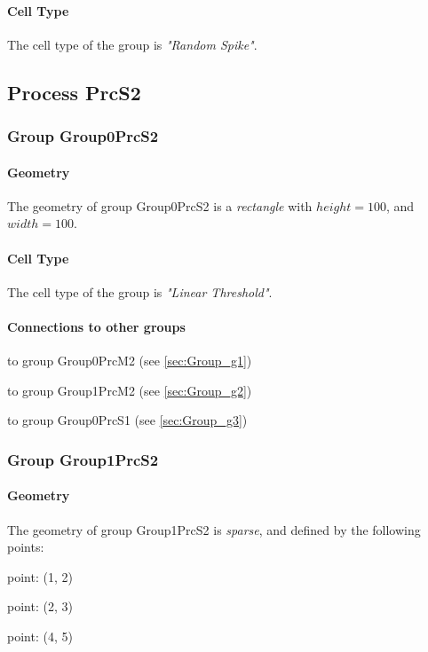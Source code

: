 \documentclass[a4paper, 11pt]{article}
\begin{document}
\paragraph*{Cell Type}
The cell type of the group is \emph{"Random Spike"}.

\subsection{Process PrcS2}


\subsubsection{Group Group0PrcS2}
\label{sec:Group_g5}

\paragraph*{Geometry}

The geometry of group Group0PrcS2 is a \emph{rectangle} with
$height= 100$, and $width= 100$.

\paragraph*{Cell Type}
The cell type of the group is \emph{"Linear Threshold"}.
\paragraph*{Connections to other groups}
\begin{compactenum}
\item to group Group0PrcM2 (see \ref{sec:Group_g1})
\item to group Group1PrcM2 (see \ref{sec:Group_g2})
\item to group Group0PrcS1 (see \ref{sec:Group_g3})
\end{compactenum}

\subsubsection{Group Group1PrcS2}
\label{sec:Group_g6}

\paragraph*{Geometry}

The geometry of group Group1PrcS2 is \emph{sparse}, and defined
by the following points:
\begin{compactitem}
   \item point: (1, 2)
   \item point: (2, 3)
   \item point: (4, 5)
\end{compactitem}
\end{document}
